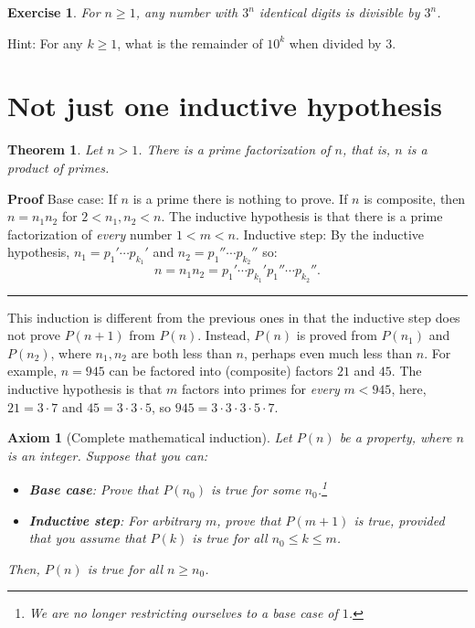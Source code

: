 \documentclass[11pt,a4paper]{report}
\newcommand*{\qed}{\hfill\rule{1ex}{1.5ex}}
\newcommand*{\qedd}[1]{\vspace*{-#1ex}\qed}
\newtheorem{theorem}{Theorem}
\newtheorem{axiom}{Axiom}
\newtheorem{exercise}{Exercise}
\begin{document}
\begin{exercise}
For $n\geq 1$, any number with $3^n$ identical digits is divisible by $3^n$.
\end{exercise}

Hint: For any $k\geq 1$, what is the remainder of $10^k$ when divided by $3$.

\section{Not just one inductive hypothesis}

\begin{theorem}\label{t.prime}
Let $n>1$. There is a prime factorization of $n$, that is, $n$ is a product of primes.
\end{theorem}

\textbf{Proof} Base case: If $n$ is a prime there is nothing to prove. If $n$ is composite, then $n=n_1 n_2$ for $2 < n_1, n_2 < n$. The inductive hypothesis is that there is a prime factorization of \emph{every} number $1<m<n$. Inductive step: By the inductive hypothesis, $n_1=p_1' \cdots p_{k_1}'$ and $n_2=p_1'' \cdots p_{k_2}''$ so:
\[
n = n_1 n_2 = p_1' \cdots p_{k_1}' p_1'' \cdots p_{k_2}''.
\]

\qedd{3}

This induction is different from the previous ones in that the inductive step does not prove $P(n+1)$ from $P(n)$. Instead, $P(n)$ is proved from $P(n_1)$ and $P(n_2)$, where $n_1,n_2$ are both less than $n$, perhaps even much less than $n$. For example, $n=945$ can be factored into (composite) factors $21$ and $45$. The inductive hypothesis is that $m$ factors into primes for \emph{every} $m<945$, here, $21=3\cdot 7$ and $45=3\cdot 3\cdot 5$, so $945=3\cdot 3\cdot 3\cdot 5\cdot 7$.

\begin{axiom}[Complete mathematical induction] Let $P(n)$ be a property, where $n$ is an integer. Suppose that you can:
\begin{itemize}
\item \textbf{Base case}: Prove that $P(n_0)$ is true for some $n_0$.\footnote{We are no longer restricting ourselves to a base case of $1$.} 
\item \textbf{Inductive step}: For arbitrary $m$, prove that $P(m+1)$ is true, provided that you \emph{assume} that $P(k)$ is true for all $n_0\leq k\leq m$.
\end{itemize}
Then, $P(n)$ is true for \emph{all} $n\geq n_0$.
\end{axiom}
\end{document}
